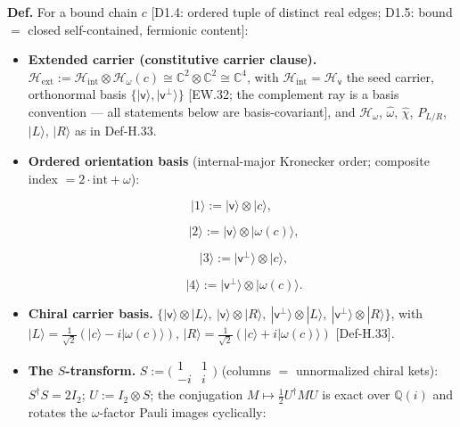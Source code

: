 \begin{definition}\label{tag:Def-H-34}
\textbf{Def.} For a bound chain $c$ [D1.4: ordered tuple of distinct real edges; D1.5: bound $=$ closed self-contained, fermionic content]:

\begin{itemize}
\item \textbf{Extended carrier (constitutive carrier clause).} $\mathcal H_{\mathrm{ext}}:=\mathcal H_{\mathrm{int}}\otimes\mathcal H_\omega(c)\cong\mathbb C^2\otimes\mathbb C^2\cong\mathbb C^4$, with $\mathcal H_{\mathrm{int}}=\mathcal H_{\mathsf v}$ the seed carrier, orthonormal basis $\{|\mathsf v\rangle,|\mathsf v^\perp\rangle\}$ [EW.32; the complement ray is a basis convention — all statements below are basis-covariant], and $\mathcal H_\omega$, $\hat\omega$, $\hat\chi$, $P_{L/R}$, $|L\rangle$, $|R\rangle$ as in Def-H.33.
\item \textbf{Ordered orientation basis} (internal-major Kronecker order; composite index $=2\cdot\mathrm{int}+\omega$):
\end{itemize}

\[
|1\rangle:=|\mathsf v\rangle\otimes|c\rangle,
\]

\[
\qquad |2\rangle:=|\mathsf v\rangle\otimes|\omega(c)\rangle,
\]

\[
\qquad |3\rangle:=|\mathsf v^\perp\rangle\otimes|c\rangle,
\]

\[
\qquad |4\rangle:=|\mathsf v^\perp\rangle\otimes|\omega(c)\rangle.
\]

\begin{itemize}
\item \textbf{Chiral carrier basis.} $\{|\mathsf v\rangle\otimes|L\rangle,\ |\mathsf v\rangle\otimes|R\rangle,\ |\mathsf v^\perp\rangle\otimes|L\rangle,\ |\mathsf v^\perp\rangle\otimes|R\rangle\}$, with $|L\rangle=\tfrac1{\sqrt2}(|c\rangle-i|\omega(c)\rangle)$, $|R\rangle=\tfrac1{\sqrt2}(|c\rangle+i|\omega(c)\rangle)$ [Def-H.33].
\item \textbf{The $S$-transform.} $S:=\bigl(\begin{smallmatrix}1&1\\-i&i\end{smallmatrix}\bigr)$ (columns $=$ unnormalized chiral kets): $S^\dagger S=2I_2$; $U:=I_2\otimes S$; the conjugation $M\mapsto\tfrac12U^\dagger MU$ is exact over $\mathbb Q(i)$ and rotates the $\omega$-factor Pauli images cyclically:
\end{itemize}


\end{definition}
